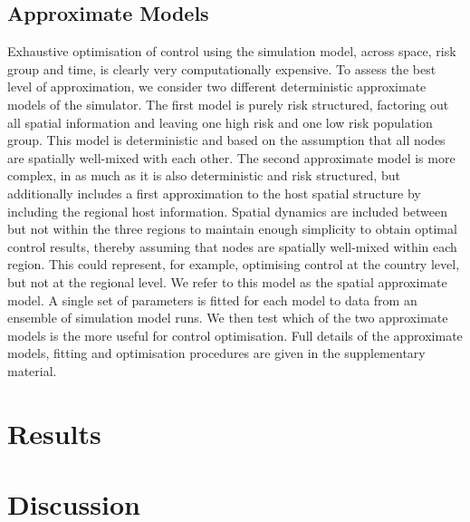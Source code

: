 \subsection{Approximate Models}

Exhaustive optimisation of control using the simulation model, across space, risk group and time, is clearly very computationally expensive. To assess the best level of approximation, we consider two different deterministic approximate models of the simulator. The first model is purely risk structured, factoring out all spatial information and leaving one high risk and one low risk population group. This model is deterministic and based on the assumption that all nodes are spatially well-mixed with each other. The second approximate model is more complex, in as much as it is also deterministic and risk structured, but additionally includes a first approximation to the host spatial structure by including the regional host information. Spatial dynamics are included between but not within the three regions to maintain enough simplicity to obtain optimal control results, thereby assuming that nodes are spatially well-mixed within each region. This could represent, for example, optimising control at the country level, but not at the regional level. We refer to this model as the spatial approximate model. A single set of parameters is fitted for each model to data from an ensemble of simulation model runs. We then test which of the two approximate models is the more useful for control optimisation. Full details of the approximate models, fitting and optimisation procedures are given in the supplementary material.

\section{Results}
\label{sec:ch4:Results}

\section{Discussion}
\label{sec:ch4:Discussion}
